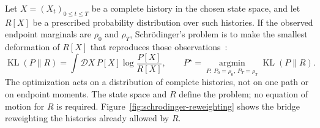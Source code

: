 \documentclass[11pt]{article}
\newcommand{\KL}{\operatorname{KL}}
\begin{document}
Let $X=(X_t)_{0\leq t\leq T}$ be a complete history in the chosen state space,
and let $R[X]$ be a prescribed probability distribution over such histories.
If the observed endpoint marginals are $\rho_0$ and $\rho_T$, Schr\"odinger's
problem is to make the smallest deformation of $R[X]$ that reproduces those
observations~\cite{schrodinger-1931,leonard-2014}:
\begin{equation}
  \KL(P\|R)
  =\int\mathcal D X\,P[X]\log\frac{P[X]}{R[X]},
  \qquad
  P^\star
  =\operatorname*{argmin}_{P:\,P_0=\rho_0,\,P_T=\rho_T}
   \KL(P\|R).
  \label{eq:schrodinger-bridge}
\end{equation}
The optimization acts on a distribution of complete histories, not on one
path or on endpoint moments. The state space and $R$ define the problem; no
equation of motion for $R$ is required.
Figure~\ref{fig:schrodinger-reweighting} shows the bridge reweighting the
histories already allowed by $R$.
\end{document}
